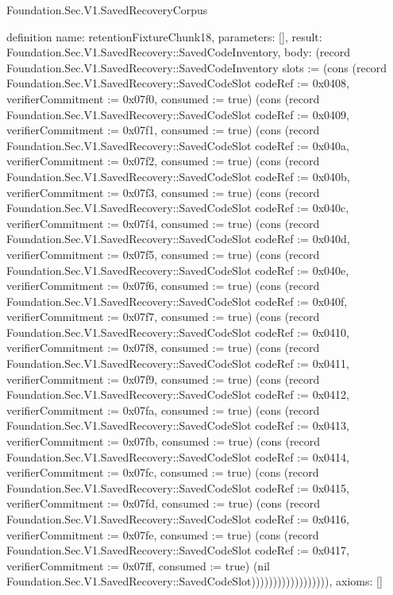 \begin{lexlean}{Foundation.Sec.V1.SavedRecoveryCorpus}
\begin{semanticmodule}
definition{
  name: retentionFixtureChunk18,
  parameters: [],
  result: Foundation.Sec.V1.SavedRecovery::SavedCodeInventory,
  body: (record Foundation.Sec.V1.SavedRecovery::SavedCodeInventory {slots := (cons (record Foundation.Sec.V1.SavedRecovery::SavedCodeSlot {codeRef := 0x0408, verifierCommitment := 0x07f0, consumed := true}) (cons (record Foundation.Sec.V1.SavedRecovery::SavedCodeSlot {codeRef := 0x0409, verifierCommitment := 0x07f1, consumed := true}) (cons (record Foundation.Sec.V1.SavedRecovery::SavedCodeSlot {codeRef := 0x040a, verifierCommitment := 0x07f2, consumed := true}) (cons (record Foundation.Sec.V1.SavedRecovery::SavedCodeSlot {codeRef := 0x040b, verifierCommitment := 0x07f3, consumed := true}) (cons (record Foundation.Sec.V1.SavedRecovery::SavedCodeSlot {codeRef := 0x040c, verifierCommitment := 0x07f4, consumed := true}) (cons (record Foundation.Sec.V1.SavedRecovery::SavedCodeSlot {codeRef := 0x040d, verifierCommitment := 0x07f5, consumed := true}) (cons (record Foundation.Sec.V1.SavedRecovery::SavedCodeSlot {codeRef := 0x040e, verifierCommitment := 0x07f6, consumed := true}) (cons (record Foundation.Sec.V1.SavedRecovery::SavedCodeSlot {codeRef := 0x040f, verifierCommitment := 0x07f7, consumed := true}) (cons (record Foundation.Sec.V1.SavedRecovery::SavedCodeSlot {codeRef := 0x0410, verifierCommitment := 0x07f8, consumed := true}) (cons (record Foundation.Sec.V1.SavedRecovery::SavedCodeSlot {codeRef := 0x0411, verifierCommitment := 0x07f9, consumed := true}) (cons (record Foundation.Sec.V1.SavedRecovery::SavedCodeSlot {codeRef := 0x0412, verifierCommitment := 0x07fa, consumed := true}) (cons (record Foundation.Sec.V1.SavedRecovery::SavedCodeSlot {codeRef := 0x0413, verifierCommitment := 0x07fb, consumed := true}) (cons (record Foundation.Sec.V1.SavedRecovery::SavedCodeSlot {codeRef := 0x0414, verifierCommitment := 0x07fc, consumed := true}) (cons (record Foundation.Sec.V1.SavedRecovery::SavedCodeSlot {codeRef := 0x0415, verifierCommitment := 0x07fd, consumed := true}) (cons (record Foundation.Sec.V1.SavedRecovery::SavedCodeSlot {codeRef := 0x0416, verifierCommitment := 0x07fe, consumed := true}) (cons (record Foundation.Sec.V1.SavedRecovery::SavedCodeSlot {codeRef := 0x0417, verifierCommitment := 0x07ff, consumed := true}) (nil Foundation.Sec.V1.SavedRecovery::SavedCodeSlot)))))))))))))))))}),
  axioms: []
}


\end{semanticmodule}
\end{lexlean}
